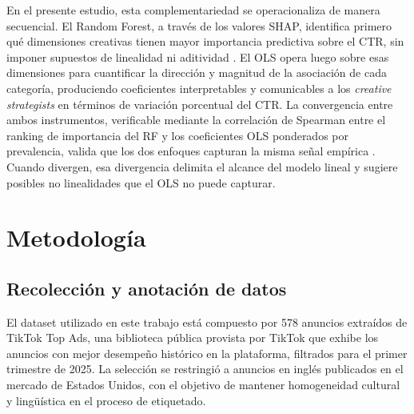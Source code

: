 \documentclass[12pt, a4paper]{report}
\begin{document}
En el presente estudio, esta complementariedad se operacionaliza de manera secuencial.
El Random Forest, a través de los valores SHAP, identifica primero qué dimensiones
creativas tienen mayor importancia predictiva sobre el CTR, sin imponer supuestos de
linealidad ni aditividad \citep{mullainathan2017}. El OLS opera luego sobre esas
dimensiones para cuantificar la dirección y magnitud de la asociación de cada categoría,
produciendo coeficientes interpretables y comunicables a los \textit{creative strategists}
en términos de variación porcentual del CTR. La convergencia entre ambos instrumentos,
verificable mediante la correlación de Spearman entre el ranking de importancia del RF
y los coeficientes OLS ponderados por prevalencia, valida que los dos enfoques capturan
la misma señal empírica \citep{breiman2001b}. Cuando divergen, esa divergencia delimita
el alcance del modelo lineal y sugiere posibles no linealidades que el OLS no puede capturar.

\chapter{Metodología}

\section{Recolección y anotación de datos}

El dataset utilizado en este trabajo está compuesto por 578 anuncios extraídos de TikTok Top Ads,
una biblioteca pública provista por TikTok que exhibe los anuncios con mejor desempeño histórico
en la plataforma, filtrados para el primer trimestre de 2025. La selección se restringió a anuncios
en inglés publicados en el mercado de Estados Unidos, con el objetivo de mantener homogeneidad
cultural y lingüística en el proceso de etiquetado.
\end{document}
